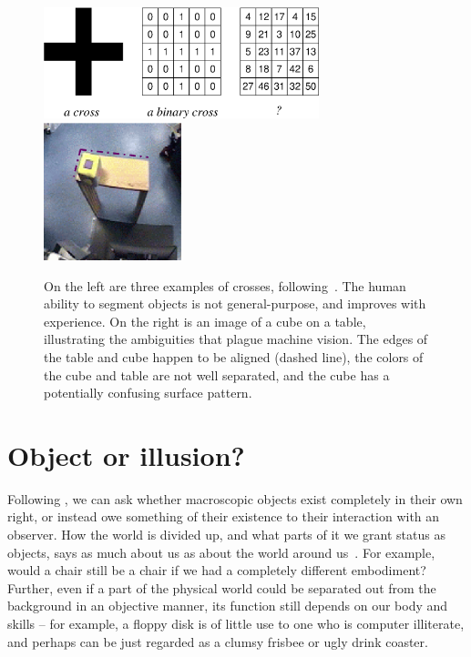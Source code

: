 %
\begin{figure}[tb]
\begin{center}
\includegraphics[width=8.0cm]{number-cross.eps}
\hspace{2cm}
\includegraphics[width=4cm]{setup-sequence.eps}
\caption{ 
%
On the left are three examples of crosses,
following~\cite{manzotti01coscienza}.  The human ability to segment
objects is not general-purpose, and improves with experience.
On the right is an image of a cube on a table, illustrating the
ambiguities that plague machine vision. 
The edges of the table and cube happen to be
aligned (dashed line), the colors of the cube and table are not well
separated, and the cube has a potentially confusing surface pattern.
%
}
\label{fig:number-cross}
\end{center}
\end{figure}
%
%


\section{Object or illusion?}

Following \cite{manzotti01coscienza}, we can ask whether macroscopic
objects exist completely in their own right, or instead owe something
of their existence to their interaction with an observer.  
How the world is divided up, and what parts of it we grant status
as objects, says as much about us as about the world around 
us~\cite{hendriksjansen96catching}.
%
%
For example, would a chair still be a chair if we had a completely different
embodiment? Further, even if a part of the physical world could be
separated out from the background in an objective manner, its function still depends on our
body and skills -- for example, a floppy disk is of
little use to one who is computer illiterate, and perhaps can be just regarded as
a clumsy frisbee or ugly drink coaster.


